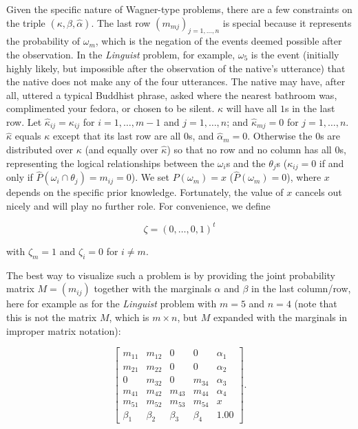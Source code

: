 \documentclass[entropy,article,submit,oneauthor,pdftex,12pt,a4paper]{mdpi}
\newcommand{\intercal}{t}
\begin{document}
Given the specific nature of Wagner-type problems, there are a few
constraints on the triple $(\kappa,\beta,\hat{\alpha})$. The last row
$(m_{mj})_{j=1,\ldots,n}$ is special because it represents the
probability of $\omega_{m}$, which is the negation of the events
deemed possible after the observation. In the \emph{Linguist} problem,
for example, $\omega_{5}$ is the event (initially highly likely, but
impossible after the observation of the native's utterance) that the
native does not make any of the four utterances. The native may have,
after all, uttered a typical Buddhist phrase, asked where the nearest
bathroom was, complimented your fedora, or chosen to be silent.
$\kappa$ will have all $1$s in the last row. Let
$\hat{\kappa}_{ij}=\kappa_{ij}$ for $i=1,\ldots,m-1$ and
$j=1,\ldots,n$; and $\hat{\kappa}_{mj}=0$ for $j=1,\ldots,n$.
$\hat{\kappa}$ equals $\kappa$ except that its last row are all $0$s,
and $\hat{\alpha}_{m}=0$. Otherwise the $0$s are distributed over
$\kappa$ (and equally over $\hat{\kappa}$) so that no row and no
column has all $0$s, representing the logical relationships between
the $\omega_{i}$s and the $\theta_{j}$s ($\kappa_{ij}=0$ if and only
if $\hat{P}(\omega_{i}\cap\theta_{j})=m_{ij}=0$). We set
$P(\omega_{m})=x$ ($\hat{P}(\omega_{m})=0$), where $x$ depends on the
specific prior knowledge. Fortunately, the value of $x$ cancels out
nicely and will play no further role. For convenience, we define

\begin{equation}
\label{eq:zeta}
\zeta=(0,\ldots,0,1)^{\intercal}
\end{equation}

{\noindent}with $\zeta_{m}=1$ and $\zeta_{i}=0$ for $i\neq{}m$.

The best way to visualize such a problem is by providing the joint
probability matrix $M=(m_{ij})$ together with the marginals $\alpha$
and $\beta$ in the last column/row, here for example as for the
\emph{Linguist} problem with $m=5$ and $n=4$ (note that this is not
the matrix $M$, which is $m\times{}n$, but $M$ expanded with the
marginals in improper matrix notation):

\begin{equation}
  \label{eq:m3}
      \left[
      \begin{array}{ccccc}
        m_{11} & m_{12} & 0 & 0 & \alpha_{1} \\
        m_{21} & m_{22} & 0 & 0 & \alpha_{2} \\
        0 & m_{32} & 0 & m_{34} & \alpha_{3} \\
        m_{41} & m_{42} & m_{43} & m_{44} & \alpha_{4} \\
        m_{51} & m_{52} & m_{53} & m_{54} & x \\
        \beta_{1} & \beta_{2} & \beta_{3} & \beta_{4} & 1.00
      \end{array}
\right].
\end{equation}
\end{document}

